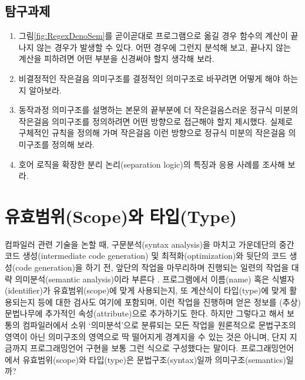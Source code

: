 \section*{탐구과제}
\begin{enumerate}[itemsep=0pt]
 \item 그림\;\ref{fig:RegexDenoSem}를 곧이곧대로 프로그램으로 옮길 경우
       함수의 계산이 끝나지 않는 경우가 발생할 수 있다.
       어떤 경우에 그런지 분석해 보고, 끝나지 않는 계산을 피하려면
       어떤 부분을 신경써야 할지 생각해 보라.
 \item 비결정적인 작은걸음 의미구조를 결정적인 의미구조로 바꾸려면
       어떻게 해야 하는지 알아보라.
 \item 동작과정 의미구조를 설명하는 본문의 끝부분에 더 작은걸음스러운
       정규식 미분의 작은걸음 의미구조를 정의하려면 어떤 방향으로 접근해야
       할지 제시했다. 실제로 구체적인 규칙을 정의해 가며 작은걸음 이런
       방향으로 정규식 미분의 작은걸음 의미구조를 정의해 보라.
 \item 호어 로직을 확장한 분리 논리(separation logic)의 특징과 응용 사례를 조사해 보라.
\end{enumerate}

\chapter{유효범위(Scope)와 타입(Type)}
컴파일러 관련 기술을 논할 때, 구문분석(syntax analysis)을 마치고
가운데단의 중간 코드 생성(intermediate code generation) 및
최적화(optimization)와 뒷단의 코드 생성(code generation)을 하기 전,
앞단의 작업을 마무리하며 진행되는 일련의 작업을 대략
의미분석(semantic analysis)이라 부른다 \cite{Aho2013compilers2nd}.
프로그램에서 이름(name) 혹은 식별자(identifier)가 유효범위(scope)에
맞게 사용되는지, 또 계산식이 타입(type)에 맞게 활용되는지 등에 대한
검사도 여기에 포함되며, 이런 작업을 진행하며 얻은 정보를 (추상)문법나무에
추가적인 속성(attribute)으로 추가하기도 한다. 하지만 그렇다고 해서
보통의 컴파일러에서 소위 `의미분석'으로 분류되는 모든 작업을 원론적으로
문법구조의 영역이 아닌 의미구조의 영역으로 딱 떨어지게 경계지을 수 있는
것은 아니며, 단지 지금까지 프로그래밍언어 구현을 보통 그런 식으로
구성했다는 말이다. 프로그래밍언어에서 유효범위(scope)와 타입(type)은
문법구조(syntax)일까 의미구조(semantics)일까?

\newpage

